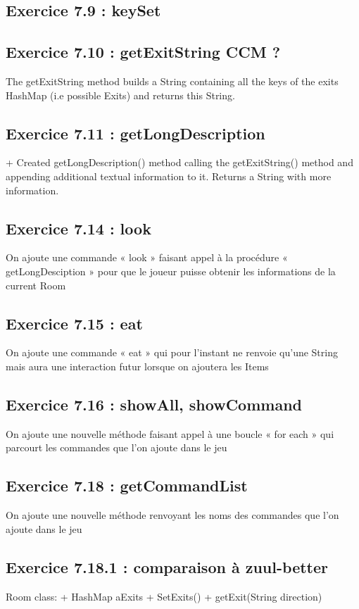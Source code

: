 \documentclass[twoside,french]{report}
\begin{document}
\subsection*{Exercice 7.9 : keySet}

\subsection*{Exercice 7.10 : getExitString CCM ?}

The getExitString method builds a String containing all the keys of the exits HashMap (i.e possible Exits) and returns this String.

\subsection*{Exercice 7.11 : getLongDescription}

+ Created getLongDescription() method calling the getExitString() method and appending additional textual information to it.
Returns a String with more information. 

\subsection*{Exercice 7.14 :  look}
On ajoute une commande « look » faisant appel à la procédure  « getLongDesciption »  pour que le joueur puisse obtenir les informations de la current Room

\subsection*{Exercice 7.15 : eat}
On ajoute une commande « eat » qui pour l’instant ne renvoie qu’une String mais aura une interaction futur lorsque on ajoutera les Items

\subsection*{Exercice 7.16 : showAll, showCommand}
On ajoute une nouvelle méthode faisant appel à une boucle « for each » qui parcourt les commandes que l’on ajoute dans le jeu

\subsection*{Exercice 7.18 : getCommandList}
On ajoute une nouvelle méthode renvoyant les noms des commandes que l’on ajoute dans le jeu

\subsection*{Exercice 7.18.1 : comparaison à zuul-better}
Room class:
+ HashMap aExits
+ SetExits()
+ getExit(String direction)
\end{document}
